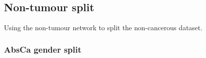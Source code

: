 \subsection{Non-tumour split} \label{s:n_ii:std}

Using the non-tumour network to split the non-cancerous dataset.

\subsubsection{AbsCa gender split}